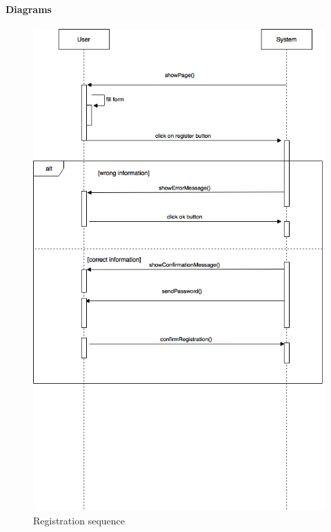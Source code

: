 \paragraph{Diagrams}
\begin{figure}[H]
   \begin{center}
    \includegraphics[width=\textwidth]{Resources/registerSequence.png}
    \caption{Registration sequence}
   \end{center}
    \label{fig:regSequence}
\end{figure}
